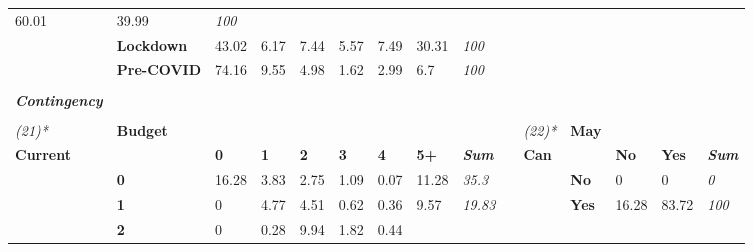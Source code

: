 \begin{table}
{\begin{threeparttable}
\begin{tabular}{lllllllllllllll}
  \cellcolor[HTML]{C8C8C8}60.01 &
  \cellcolor[HTML]{DEDEDE}39.99 &
  \textit{100} \\
 &
  \textbf{Lockdown} &
  \cellcolor[HTML]{CDCDCD}43.02 &
  \cellcolor[HTML]{FAFAFA}6.17 &
  \cellcolor[HTML]{F8F8F8}7.44 &
  \cellcolor[HTML]{FBFBFB}5.57 &
  \cellcolor[HTML]{F8F8F8}7.49 &
  \cellcolor[HTML]{DCDCDC}30.31 &
  \textit{100} &
   &
   &
   &
   &
   &
  \textit{} \\
 &
  \textbf{Pre-COVID} &
  \cellcolor[HTML]{A6A6A6}74.16 &
  \cellcolor[HTML]{F6F6F6}9.55 &
  \cellcolor[HTML]{FBFBFB}4.98 &
  \cellcolor[HTML]{FFFFFF}1.62 &
  \cellcolor[HTML]{FEFEFE}2.99 &
  \cellcolor[HTML]{F9F9F9}6.7 &
  \textit{100} &
   &
   &
   &
   &
   &
  \textit{} \\
 &
  \textbf{} &
   &
   &
   &
   &
   &
   &
  \textit{} &
   &
   &
   &
   &
   &
  \textit{} \\
\textit{\textbf{Contingency}} &
   &
   &
   &
   &
   &
   &
   &
  \textit{} &
   &
   &
   &
   &
   &
  \textit{} \\
 &
  \textbf{} &
   &
   &
   &
   &
   &
   &
  \textit{} &
   &
   &
   &
   &
   &
  \textit{} \\
\textit{(21)*} &
  \textbf{Budget} &
   &
   &
   &
   &
   &
   &
  \textit{} &
   &
  \textit{(22)*} &
  \textbf{May} &
   &
   &
  \textit{} \\
\textbf{Current} &
   &
  \textbf{0} &
  \textbf{1} &
  \textbf{2} &
  \textbf{3} &
  \textbf{4} &
  \textbf{5+} &
  \textit{\textbf{Sum}} &
  \textbf{} &
  \textbf{Can} &
   &
  \textbf{No} &
  \textbf{Yes} &
  \textit{\textbf{Sum}} \\
 &
  \textbf{0} &
  \cellcolor[HTML]{A6A6A6}16.28 &
  \cellcolor[HTML]{EBEBEB}3.83 &
  \cellcolor[HTML]{F0F0F0}2.75 &
  \cellcolor[HTML]{FAFAFA}1.09 &
  \cellcolor[HTML]{FFFFFF}0.07 &
  \cellcolor[HTML]{C2C2C2}11.28 &
  \textit{35.3} &
   &
   &
  \textbf{No} &
  \cellcolor[HTML]{FFFFFF}0 &
  \cellcolor[HTML]{FFFFFF}0 &
  \textit{0} \\
 &
  \textbf{1} &
  \cellcolor[HTML]{FFFFFF}0 &
  \cellcolor[HTML]{E5E5E5}4.77 &
  \cellcolor[HTML]{E7E7E7}4.51 &
  \cellcolor[HTML]{FCFCFC}0.62 &
  \cellcolor[HTML]{FEFEFE}0.36 &
  \cellcolor[HTML]{CBCBCB}9.57 &
  \textit{19.83} &
   &
   &
  \textbf{Yes} &
  \cellcolor[HTML]{EEEEEE}16.28 &
  \cellcolor[HTML]{A6A6A6}83.72 &
  \textit{100} \\
 &
  \textbf{2} &
  \cellcolor[HTML]{FFFFFF}0 &
  \cellcolor[HTML]{FEFEFE}0.28 &
  \cellcolor[HTML]{C9C9C9}9.94 &
  \cellcolor[HTML]{F6F6F6}1.82 &
  \cellcolor[HTML]{FDFDFD}0.44 &

\end{tabular}
\end{threeparttable}}
\end{table}
